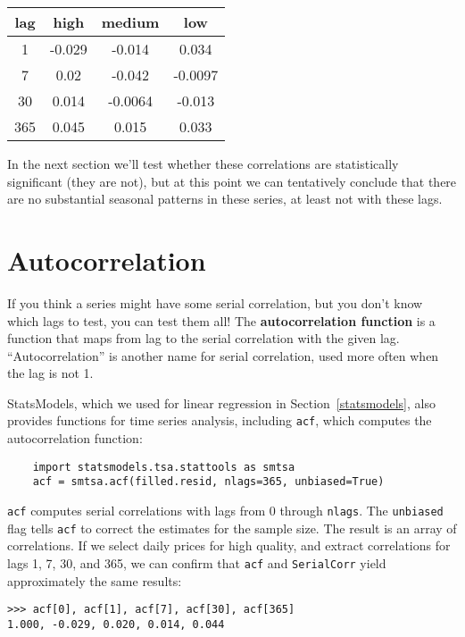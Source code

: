 \documentclass[12pt]{book}
\begin{document}
\begin{center}
\begin{tabular}{|c|c|c|c|}
\hline
lag & high & medium & low \\ \hline
1 & -0.029 & -0.014 & 0.034 \\
7 & 0.02 & -0.042 & -0.0097 \\
30 & 0.014 & -0.0064 & -0.013 \\
365 & 0.045 & 0.015 & 0.033 \\
\hline
\end{tabular}
\end{center}

In the next section we'll test whether these correlations are
statistically significant (they are not), but at this point we can
tentatively conclude that there are no substantial seasonal patterns
in these series, at least not with these lags.
   


\section{Autocorrelation}

If you think a series might have some serial correlation, but you
don't know which lags to test, you can test them all!  The {\bf
  autocorrelation function} is a function that maps from lag to the
serial correlation with the given lag.  ``Autocorrelation'' is another
name for serial correlation, used more often when the lag is not 1.

StatsModels, which we used for linear regression in
Section~\ref{statsmodels}, also provides functions for time series
analysis, including {\tt acf}, which computes the autocorrelation
function:

\begin{verbatim}
    import statsmodels.tsa.stattools as smtsa
    acf = smtsa.acf(filled.resid, nlags=365, unbiased=True)
\end{verbatim}

{\tt acf} computes serial correlations with
lags from 0 through {\tt nlags}.  The {\tt unbiased} flag tells
{\tt acf} to correct the estimates for the sample size.  The result
is an array of correlations.  If we select daily prices for high
quality, and extract correlations for lags 1, 7, 30, and 365, we can
confirm that {\tt acf} and {\tt SerialCorr} yield approximately
the same results:

\begin{verbatim}
>>> acf[0], acf[1], acf[7], acf[30], acf[365]
1.000, -0.029, 0.020, 0.014, 0.044
\end{verbatim}
\end{document}
